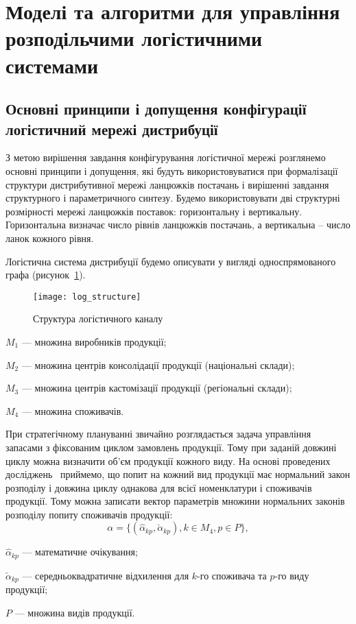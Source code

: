 \section{Моделі та алгоритми для управління розподільчими логістичними системами}
\subsection{Основні принципи і допущення конфігурації логістичний мережі дистрибуції}
З метою вирішення завдання конфігурування логістичної мережі розглянемо основні принципи і допущення, які будуть використовуватися при формалізації структури дистрибутивної мережі ланцюжків постачань і вирішенні завдання структурного і параметричного синтезу. Будемо використовувати дві структурні розмірності мережі ланцюжків поставок: горизонтальну і вертикальну. Горизонтальна визначає число рівнів ланцюжків постачань, а вертикальна -- число ланок кожного рівня.

Логістична система дистрибуції будемо описувати у вигляді односпрямованого графа (рисунок~\ref{fig:log_structure}).

\begin{figure}[H]
	\centering
	\texttt{[image: log\_structure]}
	\caption{Структура логістичного каналу~\cite{Stankevich}}
	\label{fig:log_structure}
\end{figure}
\begin{description}
	\item[де] $M_1$ --- множина виробників продукції;
	\item $M_2$ --- множина центрів консолідації продукції (національні склади);
	\item $M_3$ --- множина центрів кастомізації продукції (регіональні склади);
	\item $M_4$ --- множина споживачів.
\end{description}

При стратегічному плануванні звичайно розглядається задача управління запасами з фіксованим циклом замовлень продукції.
Тому при заданій довжині циклу можна визначити об’єм продукції кожного виду.
На основі проведених досліджень~\cite{Stankevich} приймемо, що попит на кожний вид продукції має нормальний закон розподілу і довжина циклу однакова для всієї номенклатури і споживачів продукції. Тому можна записати вектор параметрів множини   нормальних законів розподілу попиту споживачів продукції:
\begin{equation}
	\alpha = \{ (\hat{\alpha}_{kp}, \check{\alpha}_{kp} ), k \in M_4, p \in P \},
\end{equation}
\begin{description}
	\item[де] $\hat{\alpha}_{kp}$ --- математичне очікування;
	\item $\check{\alpha}_{kp}$ --- середньоквадратичне відхилення для  $k$-го споживача та $p$-го виду продукції;
	\item $P$ --- множина видів продукції.
\end{description}

